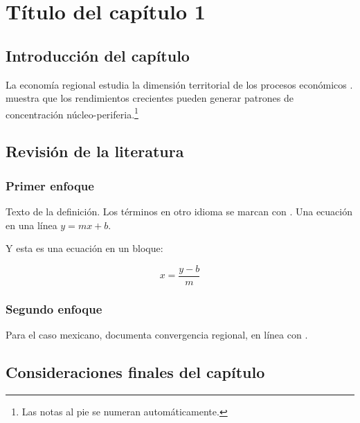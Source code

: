 \chapter{Título del capítulo 1}\label{cap:capitulo1}

\section{Introducción del capítulo}

La economía regional estudia la dimensión territorial de los procesos
económicos \parencite{capello2015}. \textcite{krugman1991} muestra que los
rendimientos crecientes pueden generar patrones de concentración
núcleo-periferia.\footnote{Las notas al pie se numeran automáticamente.}
\lipsum[5]

\section{Revisión de la literatura}

\subsection{Primer enfoque}

\lipsum[6]

\begin{definicion}\label{def:ejemplo}
Texto de la definición. Los términos en otro idioma se marcan con
. Una ecuación en una línea $y = mx + b$.
\end{definicion}
Y esta es una ecuación en un bloque:

\begin{equation}
  x = \frac{y - b}{m}
\end{equation}
\subsection{Segundo enfoque}

Para el caso mexicano, \textcite{esquivel1999} documenta convergencia regional,
en línea con \textcite{barro1992}. \lipsum[7]

\section{Consideraciones finales del capítulo}

\lipsum[8]
